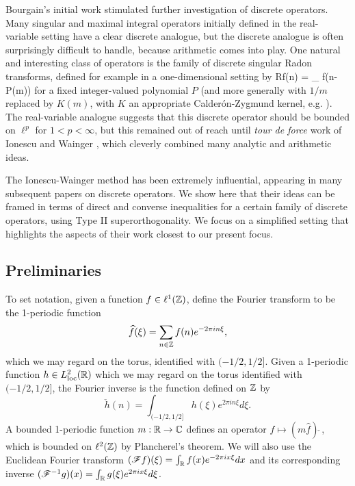 \documentclass[oneside,11pt]{amsart}
\begin{document}
Bourgain's initial work stimulated  further investigation of discrete operators. Many  singular and maximal integral operators initially defined in the real-variable setting have a clear discrete analogue, but the discrete analogue is often surprisingly difficult to handle, because arithmetic comes into play.
One natural and interesting class of  operators is the family of discrete singular Radon transforms, defined for example in a one-dimensional setting by
\beq\label{R-op}
 Rf(n) =  \sum_{} f(n-P(m))
 \eeq
for a fixed integer-valued polynomial $P$
(and more generally with $1/m$ replaced by $K(m)$, with $K$ an appropriate Calder\'on-Zygmund kernel, e.g. \cite[\S 1]{IW}).
The  real-variable analogue suggests that this discrete operator should be bounded on $\ell^p$ for $1<p<\infty$, but this remained out of reach until \emph{tour de force} work of Ionescu and Wainger \cite{IW}, which cleverly combined many analytic and arithmetic ideas. 
 

The Ionescu-Wainger method has been extremely influential, appearing in many subsequent papers on discrete operators. 
We show here that their ideas can be framed in terms of    direct and converse inequalities for a certain family of discrete operators, using Type II superorthogonality. We focus on a simplified setting that   highlights the aspects of their work closest to our present focus.


\subsection{Preliminaries}

 
To set notation, given a function $f \in \ell^1(\mathbb{Z})$, define the Fourier transform to be the  1-periodic function 
\[ \widehat{f}(\xi) = \sum_{n \in \mathbb{Z}} f(n) e^{-2\pi i n \xi},\]
which we may regard on the torus, identified with $(-1/2,1/2]$.
Given a  1-periodic function $h \in L^2_{\mathrm{loc}}(\mathbb{R})$ which we may regard on the torus identified with $(-1/2,1/2]$, the Fourier inverse is the function defined on $\mathbb{Z}$ by
\[ \check{h}(n) = \int_{(-1/2,1/2]} h(\xi) e^{2\pi i n \xi} d\xi.\]
A bounded 1-periodic function $m: \mathbb{R} \rightarrow \mathbb{C}$ defines an operator $f \mapsto (m \widehat{f})\check{\;}$, which is bounded  on $\ell^2(\mathbb{Z})$ by Plancherel's theorem.
We will also use the Euclidean Fourier transform $(\mathscr{F} f) (\xi) = \int_{\mathbb{R}} f(x) e^{-2\pi i x \xi}dx$ and its corresponding inverse $(\mathscr{F}^{-1} g)(x) = \int_{\mathbb{R}} g(\xi) e^{2\pi i x \xi}d\xi$.
\end{document}
